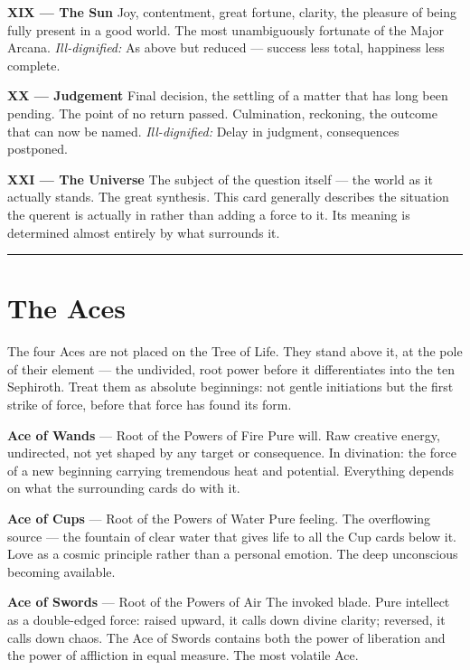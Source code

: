 \textbf{XIX --- The Sun} Joy, contentment, great fortune, clarity, the pleasure of being fully present in a good world. The most unambiguously fortunate of the Major Arcana. \emph{Ill-dignified:} As above but reduced --- success less total, happiness less complete.

\textbf{XX --- Judgement} Final decision, the settling of a matter that has long been pending. The point of no return passed. Culmination, reckoning, the outcome that can now be named. \emph{Ill-dignified:} Delay in judgment, consequences postponed.

\textbf{XXI --- The Universe} The subject of the question itself --- the world as it actually stands. The great synthesis. This card generally describes the situation the querent is actually in rather than adding a force to it. Its meaning is determined almost entirely by what surrounds it.

\begin{center}\rule{0.5\linewidth}{0.5pt}\end{center}

\section{The Aces}\label{the-aces}

The four Aces are not placed on the Tree of Life. They stand above it, at the pole of their element --- the undivided, root power before it differentiates into the ten Sephiroth. Treat them as absolute beginnings: not gentle initiations but the first strike of force, before that force has found its form.

\textbf{Ace of Wands} --- Root of the Powers of Fire Pure will. Raw creative energy, undirected, not yet shaped by any target or consequence. In divination: the force of a new beginning carrying tremendous heat and potential. Everything depends on what the surrounding cards do with it.

\textbf{Ace of Cups} --- Root of the Powers of Water Pure feeling. The overflowing source --- the fountain of clear water that gives life to all the Cup cards below it. Love as a cosmic principle rather than a personal emotion. The deep unconscious becoming available.

\textbf{Ace of Swords} --- Root of the Powers of Air The invoked blade. Pure intellect as a double-edged force: raised upward, it calls down divine clarity; reversed, it calls down chaos. The Ace of Swords contains both the power of liberation and the power of affliction in equal measure. The most volatile Ace.

